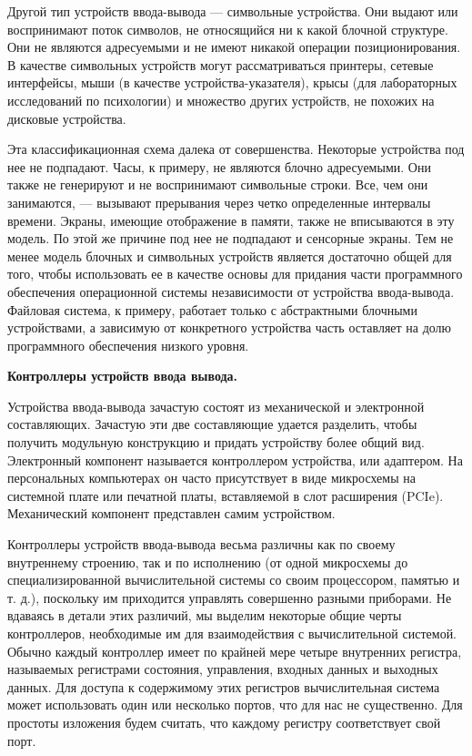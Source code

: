 Другой тип устройств ввода-вывода — символьные устройства. Они выдают или воспринимают поток символов, не относящийся ни к какой блочной структуре. Они не являются адресуемыми и не имеют никакой операции позиционирования. В качестве символьных устройств могут рассматриваться принтеры, сетевые интерфейсы, мыши (в качестве устройства-указателя), крысы (для лабораторных исследований по психологии) и множество других устройств, не похожих на дисковые устройства.

Эта классификационная схема далека от совершенства. Некоторые устройства под нее не подпадают. Часы, к примеру, не являются блочно адресуемыми. Они также не генерируют и не воспринимают символьные строки. Все, чем они занимаются, — вызывают прерывания через четко определенные интервалы времени. Экраны, имеющие отображение в памяти, также не вписываются в эту модель. По этой же причине под нее не подпадают и сенсорные экраны. Тем не менее модель блочных и символьных устройств является достаточно общей для того, чтобы использовать ее в качестве основы для придания части программного обеспечения операционной системы независимости от устройства ввода-вывода. Файловая система, к примеру, работает только с абстрактными блочными устройствами, а зависимую от конкретного устройства часть оставляет на долю программного обеспечения низкого уровня.

\begin{center}{\bfseries Контроллеры устройств ввода вывода.}
\end{center}

Устройства ввода-вывода зачастую состоят из механической и электронной составляющих. Зачастую эти две составляющие удается разделить, чтобы получить модульную конструкцию и придать устройству более общий вид. Электронный компонент называется контроллером устройства, или адаптером. На персональных компьютерах он часто присутствует в виде микросхемы на системной плате или печатной платы, вставляемой в слот расширения (PCIe). Механический компонент представлен самим устройством.

Контроллеры устройств ввода-вывода весьма различны как по своему внутреннему строению, так и по исполнению (от одной микросхемы до специализированной вычислительной системы со своим процессором, памятью и т. д.), поскольку им приходится управлять совершенно разными приборами. Не вдаваясь в детали этих различий, мы выделим некоторые общие черты контроллеров, необходимые им для взаимодействия с вычислительной системой. Обычно каждый контроллер имеет по крайней мере четыре внутренних регистра, называемых регистрами состояния, управления, входных данных и выходных данных. Для доступа к содержимому этих регистров вычислительная система может использовать один или несколько портов, что для нас не существенно. Для простоты изложения будем считать, что каждому регистру соответствует свой порт.

